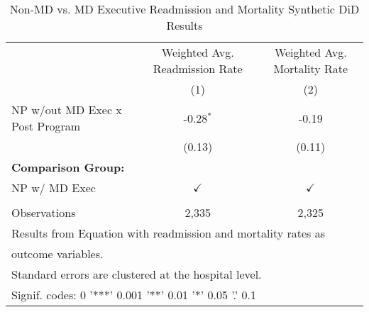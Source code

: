\begin{table}[ht!]

\caption{\label{tab:MD_noMD_readmort_synth}Non-MD vs. MD Executive Readmission and Mortality Synthetic DiD Results}
\centering
\begin{tabular}[t]{lcc}
\toprule
\multicolumn{1}{c}{ } & \multicolumn{1}{c}{Weighted Avg. Readmission Rate} & \multicolumn{1}{c}{Weighted Avg. Mortality Rate} \\
 & (1) & (2)\\
\midrule
NP w/out MD Exec x Post Program & -0.28$^{*}$ & -0.19\\
 & (0.13) & (0.11)\\
\textbf{Comparison Group:} &  & \\
NP w/ MD Exec & $\checkmark$ & $\checkmark$\\
 &  & \\
\addlinespace
Observations & 2,335 & 2,325\\
\bottomrule
\multicolumn{3}{l}{\textsuperscript{} Results from Equation with readmission and mortality rates as}\\
\multicolumn{3}{l}{outcome variables.}\\
\multicolumn{3}{l}{\textsuperscript{} Standard errors are clustered at the hospital level.}\\
\multicolumn{3}{l}{\textsuperscript{} Signif. codes: 0 '***' 0.001 '**' 0.01 '*' 0.05 '.' 0.1}\\
\end{tabular}
\end{table}
